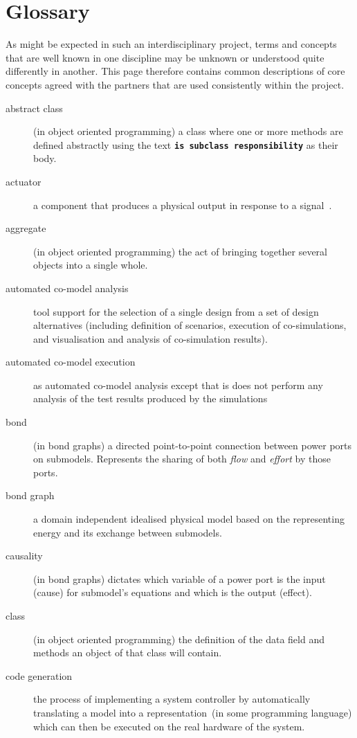 \documentclass{crescendorepchap}
\begin{document}
\appendix
\newpage


\label{ch:bib} %

\chapter{Glossary}\label{app:Glossary}

As might be expected in such an interdisciplinary project, terms and
concepts that are well known in one discipline may be unknown or
understood quite differently in another. This page therefore contains
common descriptions of core concepts agreed with the partners that are
used consistently within the project.

\begin{description}
\item[abstract class] (in object oriented programming) a class where one or more methods are defined abstractly using the text \textbf{\texttt{is subclass responsibility}} as their body.
\item[actuator] a component that produces a physical output in response to a signal~\cite{IEEE100}.
\item[aggregate] (in object oriented programming) the act of bringing together several objects into a single whole.
\item[automated co-model analysis] tool support for the selection of a single design from a set of design alternatives (including definition of scenarios, execution of co-simulations, and visualisation and analysis of co-simulation results).
\item[automated co-model execution] as automated co-model analysis except that is does not perform any analysis of the test results produced by the simulations
\item[bond] (in bond graphs) a directed point-to-point connection between power ports on submodels.  Represents the sharing of both \textit{flow} and \textit{effort} by those ports.
\item[bond graph] a domain independent idealised physical model based on the representing energy and its exchange between submodels.
\item[causality] (in bond graphs) dictates which variable of a power port is the input (cause) for submodel's equations and which is the output (effect).
\item[class] (in object oriented programming) the definition of the data field and methods an object of that class will contain.
\item[code generation] the process of implementing a system controller by automatically translating a model into a representation~(in some programming language) which can then be executed on the real hardware of the system.

\end{description}
\end{document}
